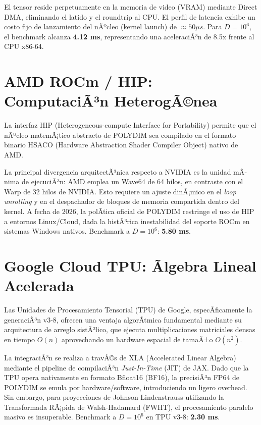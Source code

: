 El tensor reside perpetuamente en la memoria de video (VRAM) mediante Direct DMA, eliminando el latido y el roundtrip al CPU. El perfil de latencia exhibe un costo fijo de lanzamiento del nÃºcleo (kernel launch) de \(\approx 50 \mu s\). Para \(D=10^6\), el benchmark alcanza \textbf{4.12 ms}, representando una aceleraciÃ³n de 8.5x frente al CPU x86-64.

\section{AMD ROCm / HIP: ComputaciÃ³n HeterogÃ©nea}


La interfaz HIP (Heterogeneous-compute Interface for Portability) permite que el nÃºcleo matemÃ¡tico abstracto de POLYDIM sea compilado en el formato binario HSACO (Hardware Abstraction Shader Compiler Object) nativo de AMD. 

La principal divergencia arquitectÃ³nica respecto a NVIDIA es la unidad mÃ­nima de ejecuciÃ³n: AMD emplea un Wave64 de 64 hilos, en contraste con el Warp de 32 hilos de NVIDIA. Esto requiere un ajuste dinÃ¡mico en el \textit{loop unrolling} y en el despachador de bloques de memoria compartida dentro del kernel.
A fecha de 2026, la polÃ­tica oficial de POLYDIM restringe el uso de HIP a entornos Linux/Cloud, dada la histÃ³rica inestabilidad del soporte ROCm en sistemas Windows nativos.
Benchmark a \(D=10^6\): \textbf{5.80 ms}.

\section{Google Cloud TPU: Ãlgebra Lineal Acelerada}


Las Unidades de Procesamiento Tensorial (TPU) de Google, especÃ­ficamente la generaciÃ³n v3-8, ofrecen una ventaja algorÃ­tmica fundamental mediante su arquitectura de arreglo sistÃ³lico, que ejecuta multiplicaciones matriciales densas en tiempo \(O(n)\) aprovechando un hardware espacial de tamaÃ±o \(O(n^2)\).

La integraciÃ³n se realiza a travÃ©s de XLA (Accelerated Linear Algebra) mediante el pipeline de compilaciÃ³n \textit{Just-In-Time} (JIT) de JAX. Dado que la TPU opera nativamente en formato Bfloat16 (BF16), la precisiÃ³n FP64 de POLYDIM se emula por hardware/software, introduciendo un ligero overhead. Sin embargo, para proyecciones de Johnson-Lindenstrauss utilizando la Transformada RÃ¡pida de Walsh-Hadamard (FWHT), el procesamiento paralelo masivo es insuperable.
Benchmark a \(D=10^6\) en TPU v3-8: \textbf{2.30 ms}.

